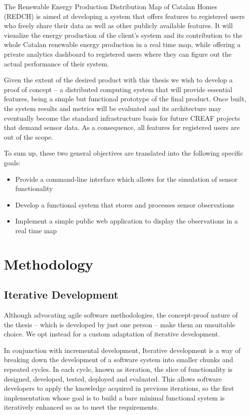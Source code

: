 The Renewable Energy Production Distribution Map of Catalan Homes (REDCH) is aimed at developing a system that offers features to registered users who freely share their data as well as other publicly available features. It will visualize the energy production of the client’s system and its contribution to the whole Catalan renewable energy production in a real time map, while offering a private analytics dashboard to registered users where they can figure out the actual performance of their system.

Given the extent of the desired product with this thesis we wish to develop a proof of concept -- a distributed computing system that will provide essential features, being a simple but functional prototype of the final product. Once built, the system results and metrics will be evaluated and its architecture may eventually become the standard infrastructure basis for future CREAF projects that demand sensor data. As a consequence, all features for registered users are out of the scope.

To sum up, these two general objectives are translated into the following specific goals:

\begin{itemize}
	\item Provide a command-line interface which allows for the simulation of sensor functionality
	\item Develop a functional system that stores and processes sensor observations
	\item Implement a simple public web application to display the observations in a real time map
\end{itemize}

\section{Methodology}

\subsection{Iterative Development}

Although advocating agile software methodologies, the concept-proof nature of the thesis -- which is developed by just one person -- make them an unsuitable choice. We opt instead for a custom adaptation of iterative development.

In conjunction with incremental development, Iterative development is a way of breaking down the development of a software system into smaller chunks and repeated cycles. In each cycle, known as iteration, the slice of functionality is designed, developed, tested, deployed and evaluated. This allows software developers to apply the knowledge acquired in previous iterations, so the first implementation whose goal is to build a bare minimal functional system is iteratively enhanced so as to meet the requirements.

